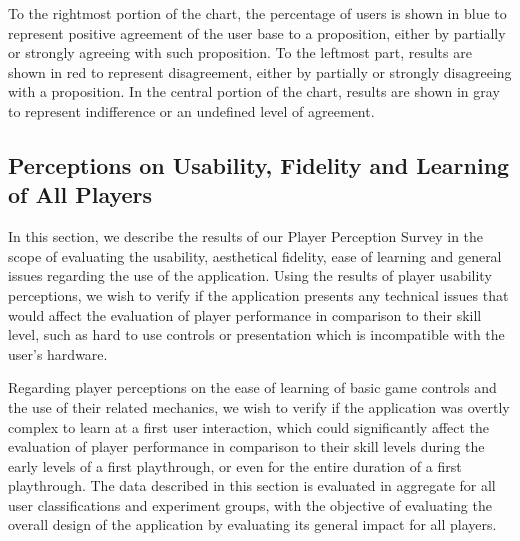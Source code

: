 To the rightmost portion of the chart, the percentage of users is shown in blue to represent positive agreement of the user base to a proposition, either by partially or strongly agreeing with such proposition. To the leftmost part, results are shown in red to represent disagreement, either by partially or strongly disagreeing with a proposition. In the central portion of the chart, results are shown in gray to represent indifference or an undefined level of agreement.

\subsection{Perceptions on Usability, Fidelity and Learning of All Players}

In this section, we describe the results of our Player Perception Survey in the scope of evaluating the usability, aesthetical fidelity, ease of learning and general issues regarding the use of the application. Using the results of player usability perceptions, we wish to verify if the application presents any technical issues that would affect the evaluation of player performance in comparison to their skill level, such as hard to use controls or presentation which is incompatible with the user's hardware.

Regarding player perceptions on the ease of learning of basic game controls and the use of their related mechanics, we wish to verify if the application was overtly complex to learn at a first user interaction, which could significantly affect the evaluation of player performance in comparison to their skill levels during the early levels of a first playthrough, or even for the entire duration of a first playthrough. The data described in this section is evaluated in aggregate for all user classifications and experiment groups, with the objective of evaluating the overall design of the application by evaluating its general impact for all players.

